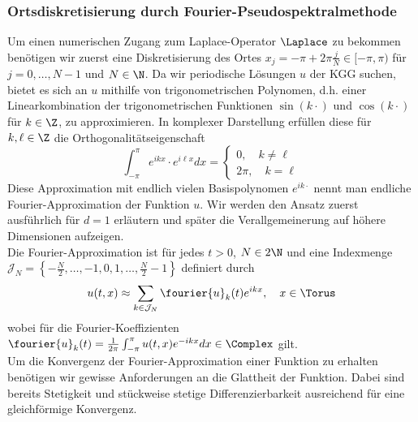 \subsubsection*{Ortsdiskretisierung durch Fourier-Pseudospektralmethode}
Um einen numerischen Zugang zum Laplace-Operator $\Laplace$ zu bekommen benötigen wir zuerst eine Diskretisierung des Ortes $x_j=-\pi+2\pi\frac{j}{N}\in [-\pi,\pi)$ für $j=0,\dots,N-1$ und $N\in\N$. Da wir periodische Lösungen $u$ der KGG suchen, bietet es sich an $u$ mithilfe von trigonometrischen Polynomen, d.h. einer Linearkombination der trigonometrischen Funktionen $\sin(k\cdot)$ und $\cos(k\cdot)$ für $k\in\Z$, zu approximieren. In komplexer Darstellung erfüllen diese für $k,\ell\in\Z$ die Orthogonalitätseigenschaft 
\[\int_{-\pi}^\pi e^{ikx}\cdot e^{i\ell x}dx=\begin{cases}0,\quad k\ne \ell\\ 2\pi,\quad k=\ell\end{cases}\]
Diese Approximation mit endlich vielen Basispolynomen $e^{ik\cdot}$ nennt man endliche Fourier-Approximation der Funktion $u$. Wir werden den Ansatz zuerst ausführlich für $d=1$ erläutern und später die Verallgemeinerung auf höhere Dimensionen aufzeigen.\\
Die Fourier-Approximation ist für jedes $t>0$, $N\in 2\N$ und eine Indexmenge $\mathcal{J}_N=\left\lbrace -\frac{N}{2},\dots,-1,0,1,\dots,\frac{N}{2}-1\right\rbrace$ definiert durch
\begin{equation}
\label{eqn:fourier_approx}
u(t,x)\approx \sum_{k\in\mathcal{J}_N}\fourier{u}_k(t)e^{ikx}, \quad x\in\Torus
\end{equation}
wobei für die Fourier-Koeffizienten $\fourier{u}_k(t)=\frac{1}{2\pi}\int_{-\pi}^\pi u(t,x)e^{-ikx}dx\in\Complex$ gilt. \\
Um die Konvergenz der Fourier-Approximation einer Funktion zu erhalten benötigen wir gewisse Anforderungen an die Glattheit der Funktion. Dabei sind bereits Stetigkeit und stückweise stetige Differenzierbarkeit ausreichend für eine gleichförmige Konvergenz. 
